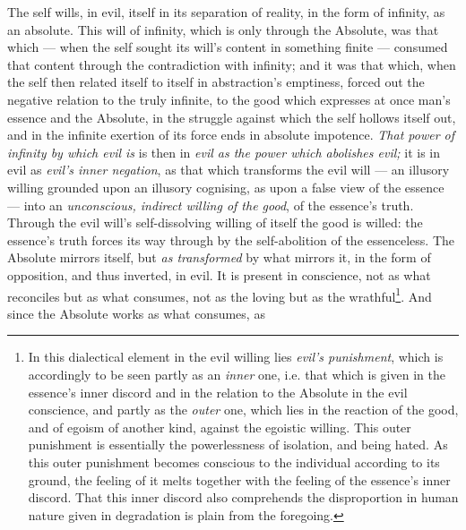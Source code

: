 \documentclass[12pt,a4paper]{book}
\begin{document}
The self wills, in evil, itself in its separation of reality, in the form of
infinity, as an absolute. This will of infinity, which is only through the
Absolute, was that which --- when the self sought its will's content in
something finite --- consumed that content through the contradiction with
infinity; and it was that which, when the self then related itself to itself in
abstraction's emptiness, forced out the negative relation to the truly infinite,
to the good which expresses at once man's essence and the Absolute, in the
struggle against which
\setcounter{footnote}{0}%
the self hollows itself out, and in the infinite exertion of its force ends in
absolute impotence. \emph{That power of infinity by which evil is} is then in
\emph{evil as the power which abolishes evil;} it is in evil as \emph{evil's
inner negation}, as that which transforms the evil will --- an illusory willing
grounded upon an illusory cognising, as upon a false view of the essence ---
into an \emph{unconscious, indirect willing of the good}, of the essence's
truth. Through the evil will's self-dissolving willing of itself the good is
willed: the essence's truth forces its way through by the self-abolition of the
essenceless. The Absolute mirrors itself, but \emph{as transformed} by what
mirrors it, in the form of opposition, and thus inverted, in evil. It is present
in conscience, not as what reconciles but as what consumes, not as the loving
but as the wrathful\footnote{In this dialectical element in the evil willing
lies \emph{evil's punishment}, which is accordingly to be seen partly as an
\emph{inner} one, i.e. that which is given in the essence's inner discord and in
the relation to the Absolute in the evil conscience, and partly as the
\emph{outer} one, which lies in the reaction of the good, and of egoism of
another kind, against the egoistic willing. This outer punishment is essentially
the powerlessness of isolation, and being hated. As this outer punishment
becomes conscious to the individual according to its ground, the feeling of it
melts together with the feeling of the essence's inner discord. That this inner
discord also comprehends the disproportion in human nature given in degradation
is plain from the foregoing.}. And since the Absolute works as what consumes, as
\end{document}
